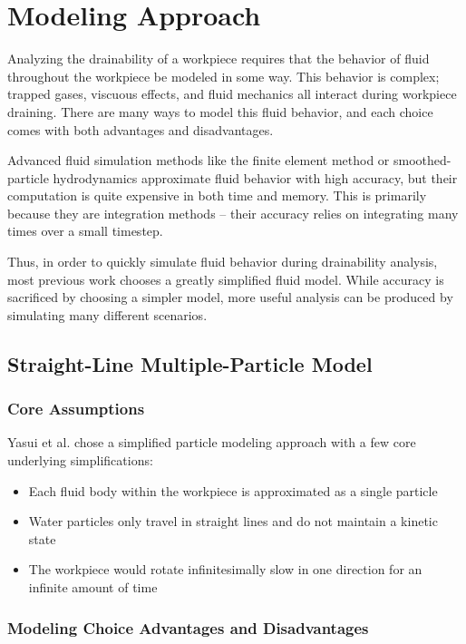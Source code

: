 						\chapter{Modeling Approach}

Analyzing the drainability of a workpiece requires that the behavior of fluid throughout the workpiece be modeled in some way. This behavior is complex; trapped gases, viscuous effects, and fluid mechanics all interact during workpiece draining. There are many ways to model this fluid behavior, and each choice comes with both advantages and disadvantages.

Advanced fluid simulation methods like the finite element method or smoothed-particle hydrodynamics approximate fluid behavior with high accuracy, but their computation is quite expensive in both time and memory. This is primarily because they are integration methods -- their accuracy relies on integrating many times over a small timestep.

Thus, in order to quickly simulate fluid behavior during drainability analysis, most previous work chooses a greatly simplified fluid model. While accuracy is sacrificed by choosing a simpler model, more useful analysis can be produced by simulating many different scenarios.

\section{Straight-Line Multiple-Particle Model}

	\subsection{Core Assumptions}

Yasui et al. \cite{plot} chose a simplified particle modeling approach with a few core underlying simplifications:

\begin{itemize}
	\item Each fluid body within the workpiece is approximated as a single particle
	\item Water particles only travel in straight lines and do not maintain a kinetic state
	\item The workpiece would rotate infinitesimally slow in one direction for an infinite amount of time
\end{itemize}

	\subsection{Modeling Choice Advantages and Disadvantages}

